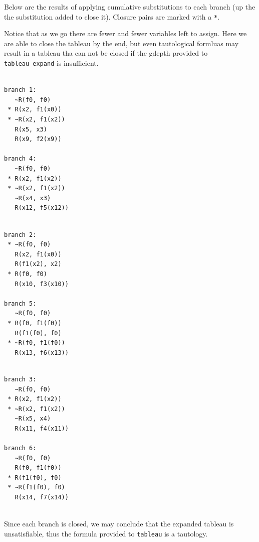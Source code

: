 \documentclass[a4paper,notitlepage]{scrartcl}
\begin{document}
Below are the results of applying cumulative substitutions to each
   branch (up the the substitution added to close it).
Closure pairs are marked with a \texttt{*}.

Notice that as we go there are fewer and fewer variables left to assign.
Here we are able to close the tableau by the end, but even tautological
   formluas may result in a tableau tha can not be closed if the gdepth
   provided to \texttt{tableau\_expand} is insufficient.

\begin{minipage}[t]{.3\textwidth}
\begin{verbatim}

branch 1:
   ~R(f0, f0)
 * R(x2, f1(x0))
 * ~R(x2, f1(x2))
   R(x5, x3)
   R(x9, f2(x9))

branch 4:
   ~R(f0, f0)
 * R(x2, f1(x2))
 * ~R(x2, f1(x2))
   ~R(x4, x3)
   R(x12, f5(x12))
\end{verbatim}
\end{minipage}
\begin{minipage}[t]{.3\textwidth}
\begin{verbatim}

branch 2:
 * ~R(f0, f0)
   R(x2, f1(x0))
   R(f1(x2), x2)
 * R(f0, f0)
   R(x10, f3(x10))

branch 5:
   ~R(f0, f0)
 * R(f0, f1(f0))
   R(f1(f0), f0)
 * ~R(f0, f1(f0))
   R(x13, f6(x13))
\end{verbatim}
\end{minipage}
\begin{minipage}[t]{.3\textwidth}
\begin{verbatim}

branch 3:
   ~R(f0, f0)
 * R(x2, f1(x2))
 * ~R(x2, f1(x2))
   ~R(x5, x4)
   R(x11, f4(x11))

branch 6:
   ~R(f0, f0)
   R(f0, f1(f0))
 * R(f1(f0), f0)
 * ~R(f1(f0), f0)
   R(x14, f7(x14))

\end{verbatim}

\end{minipage}
\hfill\  \\
Since each branch is closed, we may conclude that the expanded tableau
   is unsatisfiable, thus the formula provided to \texttt{tableau} is
   a tautology.
\end{document}
